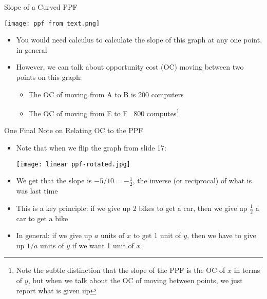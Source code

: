\documentclass[10pt,xcolor={svgnames}]{beamer}
\begin{document}
\begin{frame}{Slope of a Curved PPF}
\begin{center}
    \texttt{[image: ppf from text.png]}
\end{center}
\begin{itemize}
    \item You would need calculus to calculate the slope of this graph at any one point, in general
    \item However, we can talk about opportunity cost (OC) moving between two points on this graph:
    \begin{itemize}
        \item The OC of moving from A to B is 200 computers
        \item The OC of moving from E to F ~800 computes\footnote{Note the subtle distinction that the slope of the PPF is the OC of $x$ in terms of $y$, but when we talk about the OC of moving between points, we just report what is given up}
    \end{itemize}
\end{itemize}
\end{frame}

\begin{frame}{One Final Note on Relating OC to the PPF}
\begin{itemize}[<+->]
    \item Note that when we flip the graph from slide 17:\vspace{-1mm}
    \begin{center}
        \texttt{[image: linear ppf-rotated.jpg]}
    \end{center}
    \vspace{-3mm}
    \item We get that the slope is $-5/10=-\frac{1}{2}$, the inverse (or reciprocal) of what is was last time
    \item This is a key principle: if we give up 2 bikes to get a car, then we give up $\frac{1}{2}$ a car to get a bike
    \item In general: if we give up $a$ units of $x$ to get 1 unit of $y$, then we have to give up $1/a$ units of $y$ if we want 1 unit of $x$
\end{itemize}
\end{frame}
\end{document}
